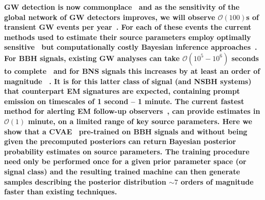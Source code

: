 \documentclass[%
showpacs,
 amsmath,amssymb,
 aps,
 twocolumn,
 prl,
 reprint,
floatfix,
]{revtex4-1}
\begin{document}
%
%
%
\textbf{ 
%
%
\ac{GW} detection is now commonplace~\cite{PhysRevLett.116.061102,
PhysRevX.6.041015,PhysRevLett.119.161101} and as the sensitivity of the global
network of \ac{GW} detectors improves, we will observe $\mathcal{O}(100)$s of
transient \ac{GW} events per year~\cite{1409.7215}. For each of these events
the current methods used to estimate their source parameters employ optimally
sensitive~\cite{2009CQGra..26o5017S} but computationally costly Bayesian inference
approaches~\cite{1409.7215}.
%
%
For \ac{BBH} signals, existing \ac{GW} analyses can take $\mathcal{O}(10^{5} -
10^{6})$ seconds to complete~\cite{1409.7215} and for \ac{BNS}
signals this increases by at least an order of magnitude
~\cite{PhysRevLett.119.161101}. It is for this latter class of signal (and
\ac{NSBH} systems) that counterpart \ac{EM} signatures are expected, containing
prompt emission on timescales of 1 second -- 1 minute. The current fastest
method for alerting \ac{EM} follow-up observers~\cite{2016PhRvD..93b4013S}, can
provide estimates in $\mathcal{O}(1)$ minute, on a limited range of key source
parameters. 
%
%
Here we show that a \ac{CVAE}~\cite{1904.06264,1812.04405} pre-trained on
\ac{BBH} signals and without being given the precomputed posteriors can return
Bayesian posterior probability estimates on source parameters. The training
procedure need only be performed once for a given prior parameter space (or
signal class) and the resulting trained machine can then generate samples
describing the posterior distribution $\sim 7$ orders of magnitude faster than
existing techniques.}
%
\end{document}
